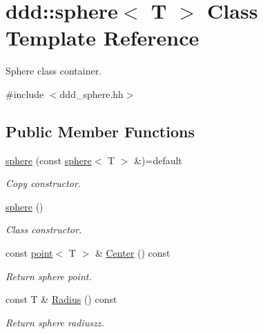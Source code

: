 \hypertarget{classddd_1_1sphere}{}\section{ddd\+:\+:sphere$<$ T $>$ Class Template Reference}
\label{classddd_1_1sphere}


Sphere class container.  




{\ttfamily \#include $<$ddd\+\_\+sphere.\+hh$>$}

\subsection*{Public Member Functions}
\begin{DoxyCompactItemize}
\item 
\mbox{\label{classddd_1_1sphere_ac434fad67b03cf195558e2b2185e6b42}} 
\hyperlink{classddd_1_1sphere_ac434fad67b03cf195558e2b2185e6b42}{sphere} (const \hyperlink{classddd_1_1sphere}{sphere}$<$ T $>$ \&)=default
\begin{DoxyCompactList}\small\item\em Copy constructor. \end{DoxyCompactList}\item 
\mbox{\label{classddd_1_1sphere_aedcf4e205c6f6ce5f23ab63de4dbb0ac}} 
\hyperlink{classddd_1_1sphere_aedcf4e205c6f6ce5f23ab63de4dbb0ac}{sphere} ()
\begin{DoxyCompactList}\small\item\em Class constructor. \end{DoxyCompactList}\item 
\mbox{\label{classddd_1_1sphere_ae6804085242cdbdc51633b2507944e31}} 
const \hyperlink{classddd_1_1point}{point}$<$ T $>$ \& \hyperlink{classddd_1_1sphere_ae6804085242cdbdc51633b2507944e31}{Center} () const
\begin{DoxyCompactList}\small\item\em Return sphere point. \end{DoxyCompactList}\item 
\mbox{\label{classddd_1_1sphere_a739abf2e15cd66120dbe306153c35caa}} 
const T \& \hyperlink{classddd_1_1sphere_a739abf2e15cd66120dbe306153c35caa}{Radius} () const
\begin{DoxyCompactList}\small\item\em Return sphere radiuszz. \end{DoxyCompactList}\end{DoxyCompactItemize}


